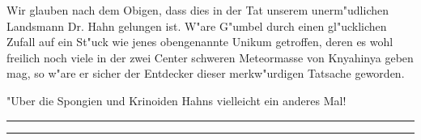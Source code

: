 \documentclass[a4paper, 12pt, oneside]{article}
\begin{document}
Wir glauben nach dem Obigen, dass dies in der Tat unserem unerm"udlichen Landsmann Dr. Hahn gelungen ist. W"are G"umbel durch einen gl"ucklichen Zufall auf ein St"uck wie jenes obengenannte Unikum getroffen, deren es wohl freilich noch viele in der zwei Center schweren Meteormasse von Knyahinya geben mag, so w"are er sicher der Entdecker dieser merkw"urdigen Tatsache geworden.

"Uber die Spongien und Krinoiden Hahns vielleicht ein anderes Mal!

\rule{\textwidth}{1.6pt}\vspace*{-\baselineskip}\vspace*{2pt} %
\rule{\textwidth}{0.4pt} %
\paragraph{}
\end{document}

